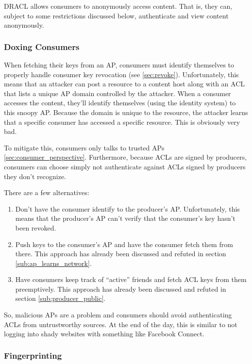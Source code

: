 \documentclass[pdftex,12pt,a4papaer,twoside,notitlepage]{report}
\begin{document}
DRACL allows consumers to anonymously access content. That is, they can, subject
to some restrictions discussed below, authenticate and view content anonymously.

\subsubsection{Doxing Consumers}
\label{sub:doxing_consumers}

When fetching their keys from an AP, consumers must identify themselves to
properly handle consumer key revocation (see \ref{sec:revoke}). Unfortunately,
this means that an attacker can post a resource to a content host along with an
ACL that lists a unique AP domain controlled by the attacker. When a consumer
accesses the content, they'll identify themselves (using the identity system) to
this snoopy AP. Because the domain is unique to the resource, the attacker
learns that a specific consumer has accessed a specific resource. This is
obviously very bad.

To mitigate this, consumers only talks to trusted APs
\ref{sec:consumer_perspective}. Furthermore, because ACLs are signed by
producers, consumers can choose simply not authenticate against ACLs signed by
producers they don't recognize.

There are a few alternatives:

\begin{enumerate}
\item Don't have the consumer identify to the producer's AP. Unfortunately, this
  means that the producer's AP can't verify that the consumer's key hasn't been
  revoked.
\item Push keys to the consumer's AP and have the consumer fetch them from
  there. This approach has already been discussed and refuted in section
  \ref{sub:ap_learns_network}.
\item Have consumers keep track of ``active'' friends and fetch ACL keys from
  them preemptively. This approach has already been discussed and refuted in
  section \ref{sub:producer_public}.
\end{enumerate}

So, malicious APs are a problem and consumers should avoid authenticating ACLs
from untrustworthy sources. At the end of the day, this is similar to not
logging into shady websites with something like Facebook Connect.

\subsubsection{Fingerprinting}
\label{sub:fingerprinting}
\end{document}
